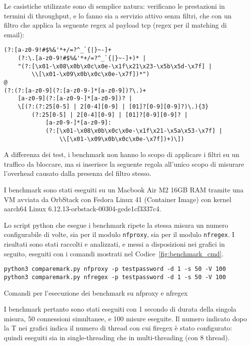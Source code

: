 Le casistiche utilizzate sono di semplice natura: verificano le prestazioni in termini di throughput, e lo fanno sia a servizio attivo senza filtri, che con un filtro che applica la seguente \gls{regex} al payload \gls{tcp} (\gls{regex} per il matching di email):
\begin{verbatim}
(?:[a-z0-9!#$%&'*+/=?^_`{|}~-]+
    (?:\.[a-z0-9!#$%&'*+/=?^_`{|}~-]+)* |
    "(?:[\x01-\x08\x0b\x0c\x0e-\x1f\x21\x23-\x5b\x5d-\x7f] |
        \\[\x01-\x09\x0b\x0c\x0e-\x7f])*")
@
(?:(?:[a-z0-9](?:[a-z0-9-]*[a-z0-9])?\.)+
    [a-z0-9](?:[a-z0-9-]*[a-z0-9])? |
    \[(?:(?:25[0-5] | 2[0-4][0-9] | [01]?[0-9][0-9]?)\.){3}
        (?:25[0-5] | 2[0-4][0-9] | [01]?[0-9][0-9]? |
            [a-z0-9-]*[a-z0-9]:
            (?:[\x01-\x08\x0b\x0c\x0e-\x1f\x21-\x5a\x53-\x7f] |
                \\[\x01-\x09\x0b\x0c\x0e-\x7f])+)\])
\end{verbatim}

A differenza dei test, i benchmark non hanno lo scopo di applicare i filtri su un traffico da bloccare, ma si inserisce la seguente regola all'unico scopo di misurare l'overhead causato dalla presenza del filtro stesso.

I benchmark sono stati eseguiti su un Macbook Air M2 16GB RAM tramite una VM avviata da OrbStack con Fedora Linux 41 (Container Image) con kernel aarch64 Linux 6.12.13-orbstack-00304-gede1cf3337c4.

Lo script python che esegue i benchmark ripete la stessa misura un numero configurabile di volte, sia per il modulo \texttt{\gls{nfproxy}}, sia per il modulo \texttt{\gls{nfregex}}.
I risultati sono stati raccolti e analizzati, e messi a disposizioni nei grafici in seguito, eseguiti con i comandi mostrati nel Codice~\ref{fig:benchmark_cmd}.
\begin{listing}[H]
\begin{verbatim}
python3 comparemark.py nfproxy -p testpassword -d 1 -s 50 -V 100
python3 comparemark.py nfregex -p testpassword -d 1 -s 50 -V 100
\end{verbatim}
\caption{Comandi per l'esecuzione dei benchmark su nfproxy e nfregex}\label{fig:benchmark_cmd}
\vspace{-1em}
\end{listing}

I benchmark pertanto sono stati eseguiti con 1 secondo di durata della singola misura, 50 connessioni simultanee, e 100 misure eseguite. Il numero indicato dopo la T nei grafici indica il numero di thread con cui firegex è stato configurato: quindi eseguiti sia in single-threading che in multi-threading (con 8 thread).

